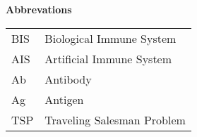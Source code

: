%
%
% 
% 
% 

\begin{center}
{\Large\bfseries Abbrevations}
\end{center}

\begin{table*}[htbp]
		\begin{tabular}{ll}
			BIS & Biological Immune System \\
			AIS & Artificial Immune System \\
			Ab & Antibody \\
			Ag & Antigen \\
			TSP & Traveling Salesman Problem
		\end{tabular}
\end{table*}